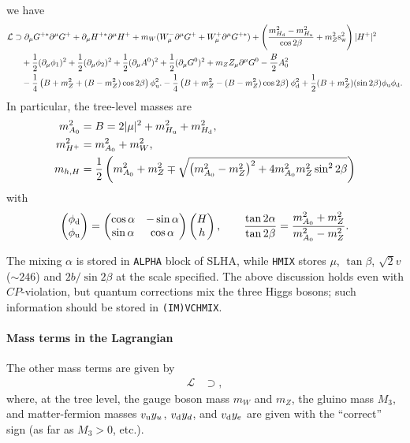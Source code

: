 \documentclass[CheatSheet]{subfiles}
\begin{document}
we have
\begin{equation}
\begin{split}
  \mathcal L &\supset
\partial_\mu G^{+*}\partial^\mu G^+
+\partial_\mu H^{+*}\partial^\mu H^+
+m_W(W^-_\mu\partial^\mu G^+ + W^+_\mu\partial^\mu G^{+*})
+ \left(\frac{m_{H_{\mathrm{d}}}^2-m_{H_{\mathrm{u}}}^2}{\cos2\beta} + m_Z^2\mathrm{s}_{\mathrm w}^2\right)|H^+|^2
\\&\quad
+\frac12(\partial_\mu\phi_1)^2
+\frac12(\partial_\mu\phi_2)^2
+\frac12(\partial_\mu A^0)^2
+\frac12(\partial_\mu G^0)^2
+m_Z Z_\mu\partial^\mu G^0
-\frac{B}{2}A_0^2
\\&\quad
-\frac14\left(B+m_Z^2+(B-m_Z^2)\cos2\beta\right)\phi_{\mathrm{u}}^2.
-\frac14\left(B+m_Z^2-(B-m_Z^2)\cos2\beta\right)\phi_{\mathrm{d}}^2
+\frac12(B+m_Z^2)(\sin 2\beta)\phi_{\mathrm{u}}\phi_{\mathrm{d}}.
\end{split}
\end{equation}
In particular, the tree-level masses are
\begin{align}
 m_{A_0}^2 &= B = 2|\mu|^2+m_{H_{\mathrm{u}}}^2+m_{H_{\mathrm{d}}}^2,
\\
 m_{H^+}^2 &= m_{A_0}^2 + m_W^2,\\
 m_{h,H} &= \frac12\left(m_{A_0}^2 + m_Z^2 \mp \sqrt{\left(m_{A_0}^2-m_Z^2\right)^2+4m_{A_0}^2m_Z^2\sin^22\beta}\right)
\end{align}
with
\begin{equation}
 \begin{pmatrix}\phi_{\mathrm{d}}\\\phi_{\mathrm{u}}\end{pmatrix} = \begin{pmatrix}\cos\alpha&-\sin\alpha\\\sin\alpha & \cos\alpha\end{pmatrix}\begin{pmatrix}H\\h\end{pmatrix},
\qquad
\frac{\tan2\alpha}{\tan2\beta} = \frac{m_{A_0}^2+m_Z^2}{m_{A_0}^2-m_Z^2}.
\end{equation}

The mixing $\alpha$ is stored in \texttt{ALPHA} block of SLHA, while \texttt{HMIX} stores $\mu$, $\tan\beta$, $\sqrt{2}v$ ($\sim246$) and $2b/\sin2\beta$ at the scale specified.
The above discussion holds even with $CP$-violation, but quantum corrections mix the three Higgs bosons; such information should be stored in \texttt{(IM)VCHMIX}.


\paragraph{Mass terms in the Lagrangian}
The other mass terms are given by
\begin{equation}
 \begin{split}
\mathcal L&\supset
   ,
 \end{split}
\end{equation}
where, at the tree level, the gauge boson mass $m_W$ and $m_Z$, the gluino mass $M_3$, and matter-fermion masses $v_{\mathrm{u}}y_{u}$, $v_{\mathrm{d}}y_{d}$, and $v_{\mathrm{d}}y_{e}$ are given with the ``correct'' sign (as far as $M_3>0$, etc.).
\end{document}
